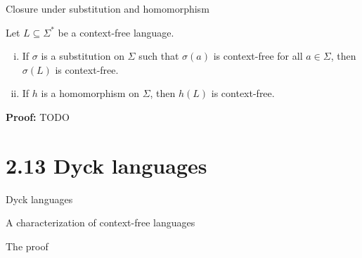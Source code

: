 \documentclass[handout]{beamer}
\begin{document}
\begin{frame}{Closure under substitution and homomorphism}
   
    \begin{theorem}
        Let $L\subseteq\Sigma^*$ be a context-free language.
        \begin{enumerate}[(i)]
            \item If $\sigma$ is a substitution on $\Sigma$ such that $\sigma(a)$ is context-free for all $a\in \Sigma$, then $\sigma(L)$ is context-free.
            \item If $h$ is a homomorphism on $\Sigma$, then $h(L)$ is context-free.
        \end{enumerate}   
    \end{theorem}

    \textbf{Proof:} TODO
    
\end{frame}


\section*{2.13 Dyck languages}


\begin{frame}{Dyck languages}

    
\end{frame}


\begin{frame}{A characterization of context-free languages}


\end{frame}


\begin{frame}{The proof}

    

\end{frame}
\end{document}
